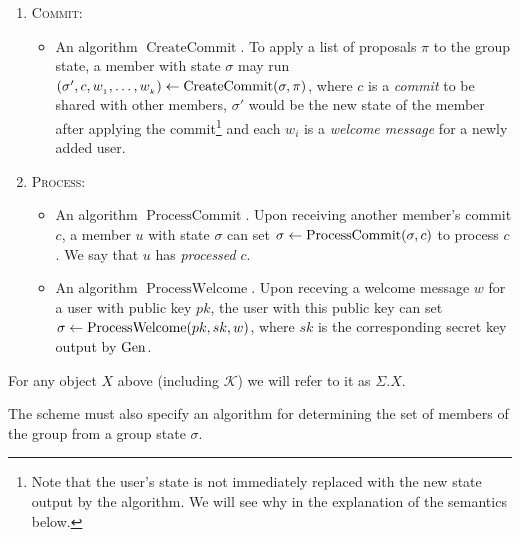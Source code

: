 \begin{definition}[PC-CGKA]
\begin{enumerate}[1.]
\begin{itemize}
			\end{itemize}
		\item[] \textsc{Commit:}
			\begin{itemize}
				\item An algorithm $\operatorname{CreateCommit}$. To apply a list of proposals $\pi$ to the group state, a member with state $\sigma$ may run $(\sigma', c, w_{_1}, \ldots, w_{_k}) \leftarrow \operatorname{CreateCommit}(\sigma, \pi)$, where $c$ is a \emph{commit} to be shared with other members, $\sigma'$ would be the new state of the member after applying the commit\footnote{Note that the user's state is not immediately replaced with the new state output by the algorithm. We will see why in the explanation of the semantics below.} and each $w_{i}$ is a \emph{welcome message} for a newly added user.
			\end{itemize}
		\item[] \textsc{Process:}
			\begin{itemize}
				\item An algorithm $\operatorname{ProcessCommit}$. Upon receiving another member's commit $c$, a member $u$ with state $\sigma$ can set $\sigma \leftarrow \operatorname{ProcessCommit}(\sigma, c)$ to process $c$. We say that $u$ has \emph{processed} $c$.
				\item An algorithm $\operatorname{ProcessWelcome}$. Upon receving a welcome message $w$ for a user with public key $pk$, the user with this public key can set $\sigma \leftarrow \operatorname{ProcessWelcome}(pk, sk, w)$, where $sk$ is the corresponding secret key output by $\mathrm{Gen}$.
			\end{itemize}
	\end{enumerate}

	For any object $X$ above (including $\mathcal{K}$) we will refer to it as $\Sigma.X$.

	The scheme must also specify an algorithm for determining the set of members of the group from a group state $\sigma$.
\end{definition}

